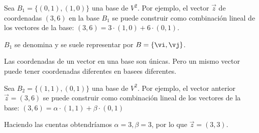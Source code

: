 \begin{example}
		Sea $B_1=\{(0,1),(1,0)\}$ una base de $ V^2$. Por ejemplo, el vector $\vec{z}$ de coordenadas $(3,6)$ en la base $B_1$ se puede construir como combinación lineal de los vectores de la base: $(3,6) = 3·(1,0) + 6·(0,1)$.

		\obs $B_1$ se denomina  y se suele representar por $B=\{\vi,\vj\}$.
\end{example}


\obs Las coordenadas de un vector en una base son únicas. Pero un mismo vector puede tener coordenadas diferentes en basees diferentes.

\begin{example}
	Sea $B_2=\{(1,1),(0,1)\}$ una base de $ V^2$. Por ejemplo, el vector anterior $\vec{z}=(3,6)$ se puede construir como combinación lineal de los vectores de la base: $(3,6) = \alpha·(1,1) + \beta·(0,1)$


	Haciendo las cuentas obtendríamos $\alpha=3, \beta=3$, por lo que $\vec{z}=(3,3)$.
\end{example}

